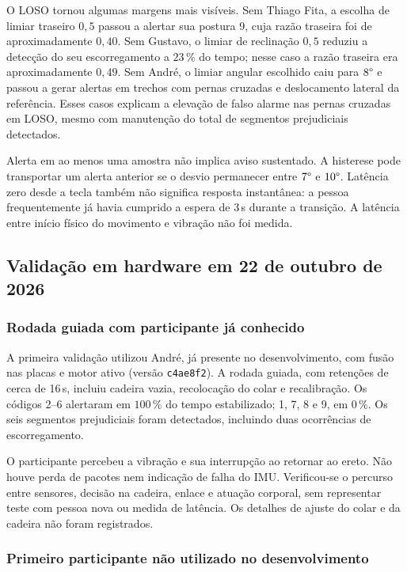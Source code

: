 O LOSO tornou algumas margens mais visíveis. Sem Thiago Fita, a escolha de
limiar traseiro $0{,}5$ passou a alertar sua postura 9, cuja razão traseira
foi de aproximadamente $0{,}40$. Sem Gustavo, o limiar de reclinação
$0{,}5$ reduziu a detecção do seu escorregamento a $23\,\%$ do tempo;
nesse caso a razão traseira era aproximadamente $0{,}49$. Sem André,
o limiar angular escolhido caiu para $8\degree{}$ e passou a gerar alertas
em trechos com pernas cruzadas e deslocamento lateral da referência.
Esses casos explicam a elevação de falso alarme nas pernas cruzadas em LOSO,
mesmo com manutenção do total de segmentos prejudiciais detectados.

Alerta em ao menos uma amostra não implica aviso sustentado. A histerese
pode transportar um alerta anterior se o desvio permanecer entre
$7\degree{}$ e $10\degree{}$. Latência zero desde a tecla também não
significa resposta instantânea: a pessoa frequentemente já havia cumprido
a espera de 3\,s durante a transição. A latência entre início físico do
movimento e vibração não foi medida.

\subsection{Validação em hardware em 22 de outubro de 2026}
\label{sec:res-hardware}

\subsubsection{Rodada guiada com participante já conhecido}

A primeira validação utilizou André, já presente no desenvolvimento, com
fusão nas placas e motor ativo (versão \texttt{c4ae8f2}). A rodada guiada,
com retenções de cerca de 16\,s, incluiu cadeira vazia, recolocação do
colar e recalibração. Os códigos 2--6 alertaram em $100\,\%$ do tempo
estabilizado; 1, 7, 8 e 9, em $0\,\%$. Os seis segmentos prejudiciais foram
detectados, incluindo duas ocorrências de escorregamento.

O participante percebeu a vibração e sua interrupção ao retornar ao ereto.
Não houve perda de pacotes nem indicação de falha do IMU. Verificou-se o
percurso entre sensores, decisão na cadeira, enlace e atuação corporal,
sem representar teste com pessoa nova ou medida de latência. Os detalhes de
ajuste do colar e da cadeira não foram registrados.

\subsubsection{Primeiro participante não utilizado no desenvolvimento}


